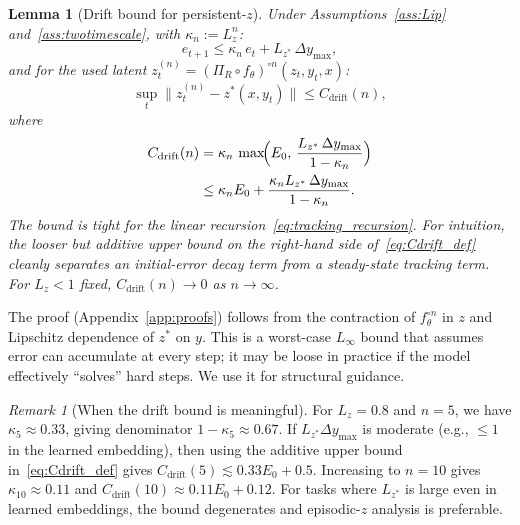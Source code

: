 \documentclass{article}
\theoremstyle{plain}
\newtheorem{lemma}[theorem]{Lemma}
\theoremstyle{definition}
\theoremstyle{remark}
\newtheorem{remark}[theorem]{Remark}
\newcommand{\Cdrift}{C_{\mathrm{drift}}}
\begin{document}
\begin{lemma}[Drift bound for persistent-$z$]
\label{lem:drift_bound}
Under Assumptions~\ref{ass:Lip} and~\ref{ass:twotimescale}, with $\kappa_n := L_z^n$:
\begin{equation}
e_{t+1} \le \kappa_n\,e_t + L_{z^*}\,\Delta y_{\max},
\label{eq:tracking_recursion}
\end{equation}
and for the used latent $z_t^{(n)} = (\Pi_R \circ f_\theta)^{\circ n}(z_t,y_t,x)$:
\begin{equation}
\sup_t \bigl\|z_t^{(n)} - z^*(x,y_t)\bigr\| \le \Cdrift(n),
\end{equation}
where
\begin{equation}
\begin{split}
\Cdrift(n)
&= \kappa_n\,\max\!\Bigl(E_0,\,\frac{L_{z^*}\,\Delta y_{\max}}{1-\kappa_n}\Bigr) \\
&\le \kappa_n E_0 + \frac{\kappa_n L_{z^*}\,\Delta y_{\max}}{1-\kappa_n}.
\end{split}
\label{eq:Cdrift_def}
\end{equation}
The bound is tight for the linear recursion~\eqref{eq:tracking_recursion}.
For intuition, the looser but additive upper bound on the right-hand side of~\eqref{eq:Cdrift_def} cleanly separates an initial-error decay term from a steady-state tracking term.
For $L_z<1$ fixed, $\Cdrift(n) \to 0$ as $n\to\infty$.
\end{lemma}

The proof (Appendix~\ref{app:proofs}) follows from the contraction of $f_\theta^{\circ n}$ in $z$ and Lipschitz dependence of $z^*$ on $y$.
This is a worst-case $L_\infty$ bound that assumes error can accumulate at every step; it may be loose in practice if the model effectively ``solves'' hard steps.
We use it for structural guidance.

\begin{remark}[When the drift bound is meaningful]
\label{rem:drift_meaningful}
For $L_z = 0.8$ and $n = 5$, we have $\kappa_5 \approx 0.33$, giving denominator $1 - \kappa_5 \approx 0.67$.
If $L_{z^*} \Delta y_{\max}$ is moderate (e.g., $\le 1$ in the learned embedding), then using the additive upper bound in~\eqref{eq:Cdrift_def} gives $\Cdrift(5) \lesssim 0.33 E_0 + 0.5$.
Increasing to $n = 10$ gives $\kappa_{10} \approx 0.11$ and $\Cdrift(10) \approx 0.11 E_0 + 0.12$.
For tasks where $L_{z^*}$ is large even in learned embeddings, the bound degenerates and episodic-$z$ analysis is preferable.
\end{remark}
\end{document}

